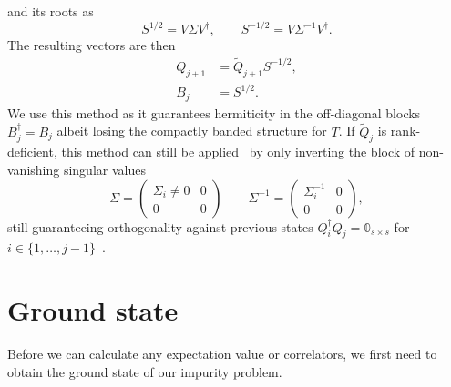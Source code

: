 and its roots as
\begin{equation}
    S^{1/2} = V \Sigma V^\dag,
    \qquad
    S^{-1/2} = V \Sigma^{-1} V^\dag.
\end{equation}
The resulting vectors are then
\begin{align}
    Q_{j+1} & = \tilde Q_{j+1} S^{-1/2}, \\
    B_j     & = S^{1/2}.
\end{align}
We use this method as it guarantees hermiticity in the off-diagonal blocks $B_j^\dag = B_j$
albeit losing the compactly banded structure for $T$.
If $\tilde Q_j$ is rank-deficient,
this method can still be applied~\cite{Brass2021} by only inverting the block of
non-vanishing singular values
\begin{equation}
    \Sigma =
    \begin{pmatrix}
        \Sigma_i \neq 0 & 0 \\
        0               & 0
    \end{pmatrix}
    \qquad
    \Sigma^{-1} =
    \begin{pmatrix}
        \Sigma_i^{-1} & 0 \\
        0             & 0
    \end{pmatrix},
\end{equation}
still guaranteeing orthogonality against previous states $Q_i^\dag Q_j = \mathbb{0}_{s\times s}$
for $i \in \{1,\ldots,j-1\}$~\cite{Golub2013}.

\section{Ground state}%
\label{sec:ground-state}

Before we can calculate any expectation value or correlators,
we first need to obtain the ground state of our impurity problem.

